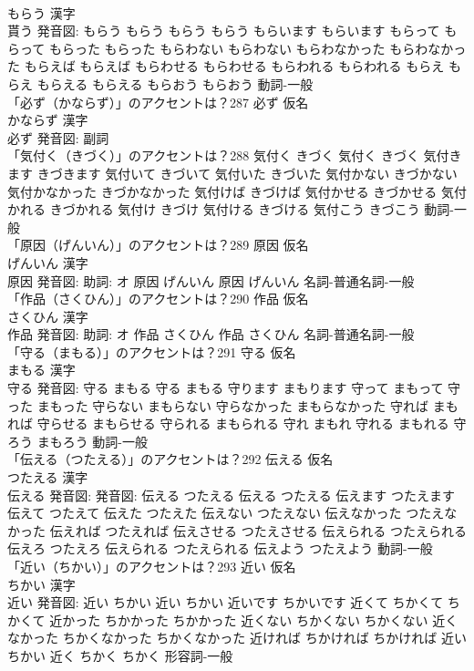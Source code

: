 \documentclass[8pt]{extreport}
\begin{document}
\begin{CJK}{UTF8}{min}
\\	もらう 漢字　
\\	貰う 発音図:	もらう もらう		もらう もらう もらいます もらいます もらって もらって もらった もらった もらわない もらわない もらわなかった もらわなかった もらえば もらえば もらわせる もらわせる もらわれる もらわれる もらえ もらえ もらえる もらえる もらおう もらおう				動詞-一般 
\\	「必ず（かならず）」のアクセントは？287	必ず 仮名　
\\	かならず 漢字　
\\	必ず 発音図:							副詞 
\\	「気付く（きづく）」のアクセントは？288		気付く きづく		気付く きづく 気付きます きづきます 気付いて きづいて 気付いた きづいた 気付かない きづかない 気付かなかった きづかなかった 気付けば きづけば 気付かせる きづかせる 気付かれる きづかれる 気付け きづけ 気付ける きづける 気付こう きづこう				動詞-一般 
\\	「原因（げんいん）」のアクセントは？289	原因 仮名　
\\	げんいん 漢字　
\\	原因 発音図: 助詞: オ	原因 げんいん		原因 げんいん				名詞-普通名詞-一般 
\\	「作品（さくひん）」のアクセントは？290	作品 仮名　
\\	さくひん 漢字　
\\	作品 発音図: 助詞: オ	作品 さくひん		作品 さくひん				名詞-普通名詞-一般 
\\	「守る（まもる）」のアクセントは？291	守る 仮名　
\\	まもる 漢字　
\\	守る 発音図:	守る まもる		守る まもる 守ります まもります 守って まもって 守った まもった 守らない まもらない 守らなかった まもらなかった 守れば まもれば 守らせる まもらせる 守られる まもられる 守れ まもれ 守れる まもれる 守ろう まもろう				動詞-一般 
\\	「伝える（つたえる）」のアクセントは？292	伝える 仮名　
\\	つたえる 漢字　
\\	伝える 発音図: 発音図:	伝える つたえる		伝える つたえる 伝えます つたえます 伝えて つたえて 伝えた つたえた 伝えない つたえない 伝えなかった つたえなかった 伝えれば つたえれば 伝えさせる つたえさせる 伝えられる つたえられる 伝えろ つたえろ 伝えられる つたえられる 伝えよう つたえよう				動詞-一般 
\\	「近い（ちかい）」のアクセントは？293	近い 仮名　
\\	ちかい 漢字　
\\	近い 発音図:	近い ちかい		近い ちかい 近いです ちかいです 近くて ちかくて ちかくて 近かった ちかかった ちかかった 近くない ちかくない ちかくない 近くなかった ちかくなかった ちかくなかった 近ければ ちかければ ちかければ 近い ちかい 近く ちかく ちかく				形容詞-一般 

\end{CJK}
\end{document}
